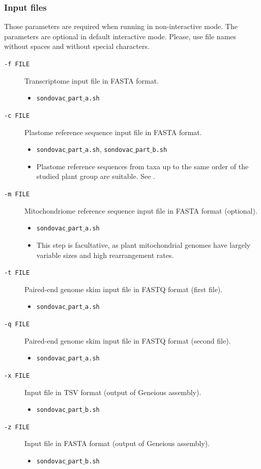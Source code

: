\documentclass[a4paper, 11pt, twoside]{article}
\begin{document}
\subsubsection{Input files}

Those parameters are required when running in non-interactive mode. The parameters are optional in default interactive mode. Please, use file names without spaces and without special characters.

\begin{description}
\item[\texttt{-f FILE}] Transcriptome input file in FASTA format.
  \begin{itemize}
    \item \texttt{sondovac$\_$part$\_$a.sh}
  \end{itemize}
\item[\texttt{-c FILE}] Plastome reference sequence input file in FASTA format.
  \begin{itemize}
    \item \texttt{sondovac$\_$part$\_$a.sh}, \texttt{sondovac$\_$part$\_$b.sh}
    \item Plastome reference sequences from taxa up to the same order of the studied plant group are suitable. See \citet{Straub2012}.
  \end{itemize}
\item[\texttt{-m FILE}] Mitochondriome reference sequence input file in FASTA format (optional).
  \begin{itemize}
    \item \texttt{sondovac$\_$part$\_$a.sh}
    \item This step is facultative, as plant mitochondrial genomes have largely variable sizes and high rearrangement rates.
  \end{itemize}
\item[\texttt{-t FILE}] Paired-end genome skim input file in FASTQ format (first file).
  \begin{itemize}
    \item \texttt{sondovac$\_$part$\_$a.sh}
  \end{itemize}
\item[\texttt{-q FILE}] Paired-end genome skim input file in FASTQ format (second file).
  \begin{itemize}
    \item \texttt{sondovac$\_$part$\_$a.sh}
  \end{itemize}
\item[\texttt{-x FILE}] Input file in TSV format (output of Geneious assembly).
  \begin{itemize}
    \item \texttt{sondovac$\_$part$\_$b.sh}
  \end{itemize}
\item[\texttt{-z FILE}] Input file in FASTA format (output of Geneious assembly).
  \begin{itemize}
    \item \texttt{sondovac$\_$part$\_$b.sh}
  \end{itemize}
\end{description}
\end{document}

